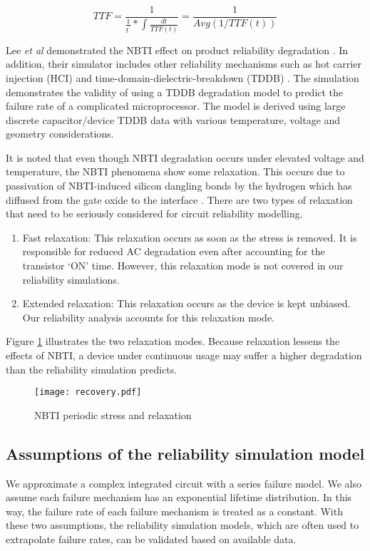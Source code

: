 \documentclass[11pt,a4paper]{article}
\begin{document}
\begin{equation} 
TTF=\frac{1}{\frac{1}{t^\prime}*\int{\frac{dt}{TTF(t)}}} = \frac{1}{Avg(1/TTF(t))}
\label{eq5}	
\end{equation}

Lee \textit{et al}  demonstrated the NBTI effect on product reliability degradation \cite{Lee}. 
In addition, their simulator  includes  other reliability mechanisms such as hot carrier injection (HCI) and time-domain-dielectric-breakdown (TDDB) \cite{Lee}. The simulation demonstrates the validity of using a TDDB degradation model to predict the failure rate of a complicated microprocessor. The model is derived using large discrete capacitor/device TDDB data with various temperature, voltage and geometry considerations.

It is noted that even though NBTI degradation occurs under elevated voltage and temperature, the NBTI phenomena show some relaxation. This occurs due to passivation of NBTI-induced silicon dangling bonds by the hydrogen which has diffused from the gate oxide to the interface \cite{Kufluoglu}. There are two types of relaxation that need to be seriously considered for circuit reliability modelling.

\begin{enumerate}
\item Fast relaxation: This relaxation occurs as soon as the stress is removed. It is responsible for reduced AC degradation even after accounting for the transistor `ON' time. However, this relaxation mode is not covered in our reliability simulations.
\item Extended relaxation: This relaxation occurs as the device is kept unbiased. Our reliability analysis accounts  for this relaxation mode.


\end{enumerate}
Figure \ref{figure 12} illustrates the two relaxation modes.
Because relaxation lessens the effects of NBTI, a device under continuous usage may suffer a higher degradation than  the reliability simulation predicts. 
\begin{figure}[t]
\centering
\texttt{[image: recovery.pdf]}
\caption{NBTI periodic stress and relaxation}
\label{figure 12}
\end{figure}


\subsection{Assumptions of the reliability simulation model}
We  approximate a complex integrated circuit with a  series failure model. 
We also assume each failure mechanism
has an exponential lifetime distribution. In this way, the failure rate of each failure mechanism is treated as a constant. With these two assumptions, the reliability simulation models, which are often used to extrapolate failure rates, can be validated based on available data. 
\end{document}
